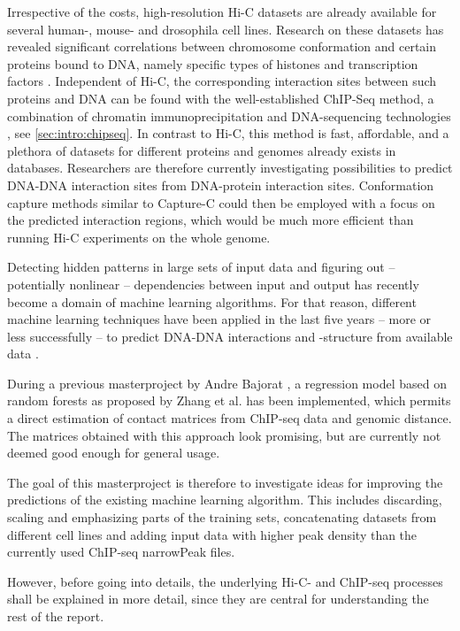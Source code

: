 Irrespective of the costs, high-resolution Hi-C datasets are already available for several 
human-, mouse- and drosophila cell lines.
Research on these datasets has revealed significant correlations between 
chromosome conformation and certain proteins bound to DNA, namely specific types of histones 
and transcription factors \cite{Bonev2016, Rao2014}.
Independent of Hi-C, the corresponding interaction sites between such proteins and DNA can be found with the well-established ChIP-Seq method,
a combination of chromatin immunoprecipitation and DNA-sequencing technologies \cite{Johnson2007, Robertson2007}, see
\autoref{sec:intro:chipseq}. 
In contrast to Hi-C, this method is fast, affordable, and a plethora of datasets for different proteins and genomes
already exists in databases.
Researchers are therefore currently investigating possibilities to predict DNA-DNA interaction sites 
from DNA-protein interaction sites. Conformation capture methods similar to Capture-C \cite{Hughes2014} could then be employed 
with a focus on the predicted interaction regions, which would be much more efficient than running Hi-C experiments on the whole genome.

Detecting hidden patterns in large sets of input data and figuring out -- potentially nonlinear -- dependencies between input and output
has recently become a domain of machine learning algorithms. 
For that reason, different machine learning techniques have been applied in the last five years -- more or less successfully -- 
to predict DNA-DNA interactions and -structure from available data \cite{Pierro2017,Farre2018,Schwessinger2019,Li2019,Zhang2019}.

During a previous masterproject by Andre Bajorat \cite{Bajorat2019}, 
a regression model based on random forests as proposed by Zhang et al. \cite{Zhang2019, Zhang2018}
has been implemented, which permits a direct estimation of contact matrices from ChIP-seq data and genomic distance.
The matrices obtained with this approach look promising, but are currently not deemed good enough for general usage.

The goal of this masterproject is therefore to investigate ideas for improving the predictions of the existing machine learning algorithm.
This includes discarding, scaling and emphasizing parts of the training sets, concatenating datasets from different cell lines 
and adding input data with higher peak density than the currently used ChIP-seq narrowPeak files.

However, before going into details, 
the underlying Hi-C- and ChIP-seq processes shall be explained in more detail,
since they are central for understanding the rest of the report.

